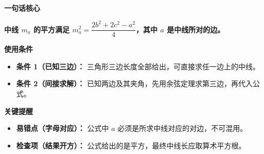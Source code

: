 \begin{summarybox}
	\textbf{\textcolor{CSummary}{一句话核心}}

	\textbf{中线 $m_a$ 的平方满足 $m_a^2 = \dfrac{2b^2+2c^2-a^2}{4}$，其中 $a$ 是中线所对的边。}

	\medskip
	\textbf{\textcolor{CSummary}{使用条件}}
	\begin{itemize}[leftmargin=*, itemsep=0.5em, topsep=0.4em]
		\item \textbf{条件 1（已知三边）：} 三角形三边长度全部给出，可直接求任一边上的中线。
		\item \textbf{条件 2（间接求解）：} 已知两边及其夹角，先用余弦定理求第三边，再代入公式。
	\end{itemize}

	\medskip
	\textbf{\textcolor{CSummary}{关键提醒}}
	\begin{itemize}[leftmargin=*, itemsep=0.5em, topsep=0.4em]
		\item \textbf{易错点（字母对应）：} 公式中 $a$ 必须是所求中线对应的对边，不可混用。
		\item \textbf{检查项（结果开方）：} 公式给出的是平方，最终中线长应取算术平方根。
	\end{itemize}
\end{summarybox}
